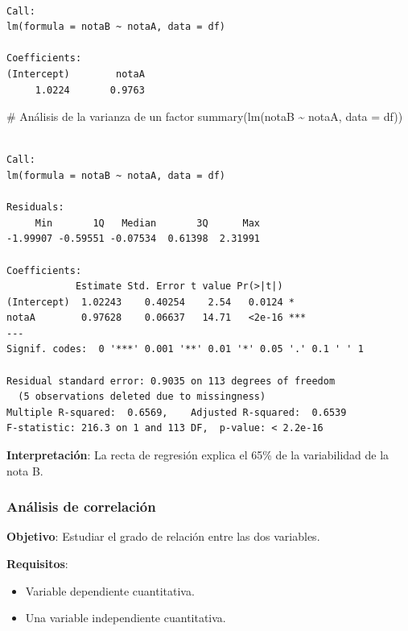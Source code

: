 \documentclass[
  a4paper,
]{scrreport}
\newenvironment{Shaded}{\begin{snugshade}}{\end{snugshade}}
\newcommand{\AttributeTok}[1]{\textcolor[rgb]{0.40,0.45,0.13}{#1}}
\newcommand{\CommentTok}[1]{\textcolor[rgb]{0.37,0.37,0.37}{#1}}
\newcommand{\FunctionTok}[1]{\textcolor[rgb]{0.28,0.35,0.67}{#1}}
\newcommand{\NormalTok}[1]{\textcolor[rgb]{0.00,0.23,0.31}{#1}}
\newcommand{\SpecialCharTok}[1]{\textcolor[rgb]{0.37,0.37,0.37}{#1}}
\providecommand{\tightlist}{%
  \setlength{\itemsep}{0pt}\setlength{\parskip}{0pt}}\usepackage{longtable,booktabs,array}
\theoremstyle{definition}
\theoremstyle{definition}
\theoremstyle{remark}
\begin{document}
\begin{verbatim}

Call:
lm(formula = notaB ~ notaA, data = df)

Coefficients:
(Intercept)        notaA  
     1.0224       0.9763  
\end{verbatim}

\begin{Shaded}
\begin{Highlighting}[]
\CommentTok{\# Análisis de la varianza de un factor}
\FunctionTok{summary}\NormalTok{(}\FunctionTok{lm}\NormalTok{(notaB }\SpecialCharTok{\textasciitilde{}}\NormalTok{ notaA, }\AttributeTok{data =}\NormalTok{ df))}
\end{Highlighting}
\end{Shaded}

\begin{verbatim}

Call:
lm(formula = notaB ~ notaA, data = df)

Residuals:
     Min       1Q   Median       3Q      Max 
-1.99907 -0.59551 -0.07534  0.61398  2.31991 

Coefficients:
            Estimate Std. Error t value Pr(>|t|)    
(Intercept)  1.02243    0.40254    2.54   0.0124 *  
notaA        0.97628    0.06637   14.71   <2e-16 ***
---
Signif. codes:  0 '***' 0.001 '**' 0.01 '*' 0.05 '.' 0.1 ' ' 1

Residual standard error: 0.9035 on 113 degrees of freedom
  (5 observations deleted due to missingness)
Multiple R-squared:  0.6569,    Adjusted R-squared:  0.6539 
F-statistic: 216.3 on 1 and 113 DF,  p-value: < 2.2e-16
\end{verbatim}

\textbf{Interpretación}: La recta de regresión explica el 65\% de la
variabilidad de la nota B.

\hypertarget{anuxe1lisis-de-correlaciuxf3n}{%
\subsubsection{Análisis de
correlación}\label{anuxe1lisis-de-correlaciuxf3n}}

\textbf{Objetivo}: Estudiar el grado de relación entre las dos
variables.

\textbf{Requisitos}:

\begin{itemize}
\tightlist
\item
  Variable dependiente cuantitativa.
\item
  Una variable independiente cuantitativa.
\end{itemize}
\end{document}
